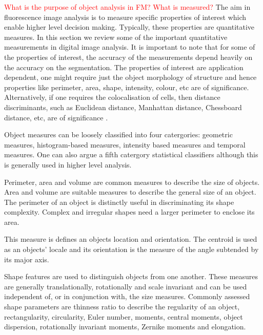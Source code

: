 \textcolor{red}{What is the purpose of object analysis in FM? What is measured?}
The aim in fluorescence image analysis is to measure specific properties of interest which enable higher level decision making.
Typically, these properties are quantitative measures.
In this section we review some of the important quantitative measurements in digital image analysis.
It is important to note that for some of the properties of interest, the accuracy of the measurements depend heavily on the accuracy on the segmentation.
The properties of interest are application dependent, one might require just the object morphology of structure and hence properties like perimeter, area, shape, intensity, colour, etc are of significance.
Alternatively, if one requires the colocalisation of cells, then distance discriminants, such as Euclidean distance, Manhattan distance, Chessboard distance, etc, are of significance \citep{Fatima2008_2,Danek2012}.

Object measures can be loosely classified into four catergories: geometric measures, histogram-based measures, intensity based measures and temporal measures. One can also argue a fifth catergory statistical classifiers although this is generally used in higher level analysis.

\begin{definition}
	Perimeter, area and volume are common measures to describe the size of objects.
	Area and volume are suitable measures to describe the general size of an object.
	The perimeter of an object is distinctly useful in discriminating its shape complexity. Complex and irregular shapes need a larger perimeter to enclose its area.
\end{definition}

\begin{definition}
	This measure is defines an objects location and orientation.
	The centroid is used as an objects' locale and its orientation is the measure of the angle subtended by its major axis.
\end{definition}

\begin{definition}
	Shape features are used to distinguish objects from one another.
	These measures are generally translationally, rotationally and scale invariant and can be used independent of, or in conjunction with, the size measures.
	Commonly assessed shape parameters are thinness ratio to describe the regularity of an object, rectangularity, circularity, Euler number, moments, central moments, object dispersion, rotationally invariant moments, Zernike moments and elongation.
\end{definition}

